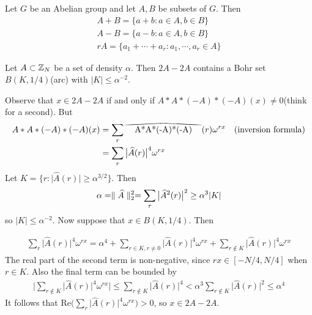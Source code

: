 \documentclass[10pt,a4paper]{report}
\newcommand\reallywidehat[1]{%
\savestack{\tmpbox}{\stretchto{%
  \scaleto{%
    \scalerel*[\widthof{\ensuremath{#1}}]{\kern-.6pt\bigwedge\kern-.6pt}%
    {\rule[-\textheight/2]{1ex}{\textheight}}%
  }{\textheight}%
}{0.5ex}}%
\stackon[1pt]{#1}{\tmpbox}%
}
\renewcommand{\hat}{\widehat}
\newenvironment{proof}
{\begin{changemargin}{1cm}{0.5cm} 
	}%
	{\end{changemargin}
}
\begin{document}
 Let $G$ be an Abelian group and let $A,B$ be subsets of $G$. Then 
\begin{align*}
A+B = \{ a+b: a\in A, b\in B\} \\
A-B = \{a-b: a\in A, b\in B\} \\
rA = \{a_1+ \cdots + a_r : a_1,\cdots,a_r \in A  \}
\end{align*}
\s

 Let $A\subset \mathbb{Z}_N$ be a set of density $\alpha$. Then $2A-2A$ contains a Bohr set $B(K,1/4)$(arc) with $|K|\leq \alpha^{-2}$.

\begin{proof}
\pf Observe that $x\in 2A-2A$ if and only if $A*A*(-A)*(-A)(x) \neq 0$(think for a second). But
\begin{align*}
A*A*(-A)*(-A)(x) &= \sum_{r} \reallywidehat{A*A*(-A)*(-A)}(r) \omega^{rx} \quad \text{(inversion formula)} \\
&= \sum_r  \big| \hat{A}(r) \big|^4 \omega^{rx}
\end{align*}
Let $K = \{r: \big| \hat{A}(r) \big| \geq \alpha^{3/2} \}$. Then 
\begin{align*}
\alpha = \norms{\hat{A}}{2}^2 = \sum_{r} \big| \hat{A}^2(r) \big|^2 \geq \alpha^3 |K|
\end{align*}
so $|K| \leq \alpha^{-2}$.
\quad Now suppose that $x\in B(K,1/4)$. Then 

\begin{align*}
\sum_{r} \big| \hat{A}(r)\big|^4 \omega^{rx}  = \alpha^4 + \sum_{r\in K,r\neq 0} \big| \hat{A}(r)\big|^4 \omega^{rx} + \sum_{r \notin K} \big| \hat{A}(r)\big|^4 \omega^{rx}
\end{align*}
The real part of the second term is non-negative, since $rx\in [-N/4,N/4]$ when $r\in K$. Also the final term can be bounded by
\begin{align*}
\Big| \sum_{r \notin K} \big| \hat{A}(r)\big|^4 \omega^{rx} \Big| \leq \sum_{r \notin K} \big| \hat{A}(r)\big|^4 < \alpha^3 \sum_{r \notin K} \big| \hat{A}(r)\big|^2 \leq \alpha^4
\end{align*}
It follows that $\text{Re}\Big( \sum_r  \big| \hat{A}(r) \big|^4 \omega^{rx} \Big) >0$, so $x\in 2A-2A$.

\eop
\end{proof}
\s
\end{document}
